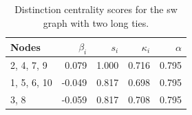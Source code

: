 \begin{table}
\centering
\caption{\label{tab:sw2}Distinction centrality scores for the sw graph with two long ties.}
\centering
\begin{tabular}[t]{lrrrr}
\toprule
Nodes & $\beta_i$ & $s_i$ & $\kappa_i$ & $\alpha$\\
\midrule
2, 4, 7, 9 & 0.079 & 1.000 & 0.716 & 0.795\\
1, 5, 6, 10 & -0.049 & 0.817 & 0.698 & 0.795\\
3, 8 & -0.059 & 0.817 & 0.708 & 0.795\\
\bottomrule
\end{tabular}
\end{table}

